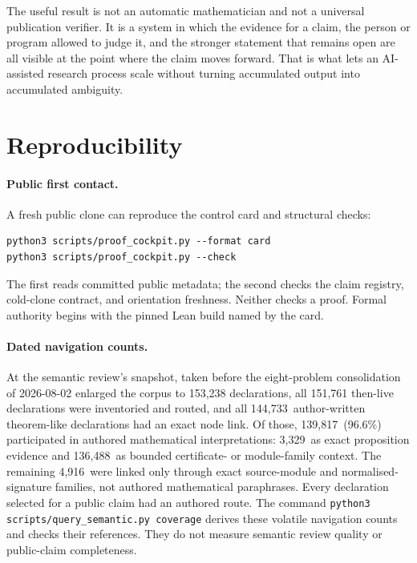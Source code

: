 \documentclass[10pt]{article}
\newcommand{\SemanticAuthoredTheoremLike}{144,733}
\newcommand{\SemanticAuthoredInterpreted}{139,817}
\newcommand{\SemanticDirectEvidence}{3,329}
\newcommand{\SemanticContextual}{136,488}
\newcommand{\SemanticStructuralOnly}{4,916}
\newcommand{\SemanticAuthoredPercent}{96.6}
\begin{document}
The useful result is not an automatic mathematician and not a universal
publication verifier. It is a system in which the evidence for a claim, the
person or program allowed to judge it, and the stronger statement that remains
open are all visible at the point where the claim moves forward. That is what
lets an AI-assisted research process scale without turning accumulated output
into accumulated ambiguity.

\appendix
\small
\section{Reproducibility}\label{app:repro}

\paragraph{Public first contact.}
A fresh public clone can reproduce the control card and structural checks:
\begin{verbatim}
python3 scripts/proof_cockpit.py --format card
python3 scripts/proof_cockpit.py --check
\end{verbatim}
The first reads committed public metadata; the second checks the claim
registry, cold-clone contract, and orientation freshness.  Neither checks a
proof.  Formal authority begins with the pinned Lean build named by the card.

\paragraph{Dated navigation counts.}
At the semantic review's snapshot, taken before the eight-problem
consolidation of 2026-08-02 enlarged the corpus to 153,238 declarations, all
151,761 then-live declarations were inventoried and routed, and all
\SemanticAuthoredTheoremLike\ author-written theorem-like
declarations had an exact node link.  Of those,
\SemanticAuthoredInterpreted\ (\SemanticAuthoredPercent\%) participated in
authored mathematical interpretations: \SemanticDirectEvidence\ as exact
proposition evidence and \SemanticContextual\ as bounded certificate- or
module-family context.  The remaining \SemanticStructuralOnly\ were linked only
through exact source-module and normalised-signature families, not authored
mathematical paraphrases.  Every declaration selected for a public claim had
an authored route.  The command
\texttt{python3 scripts/query\_semantic.py coverage} derives these volatile
navigation counts and checks their references.  They do not measure semantic
review quality or public-claim completeness.
\end{document}

